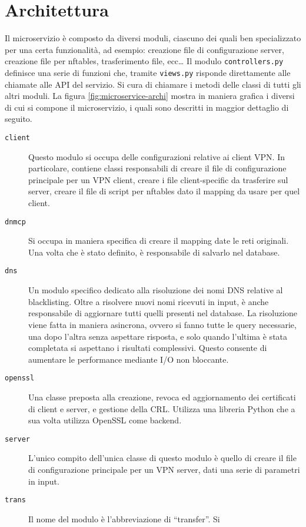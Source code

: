 \section{Architettura}
Il microservizio è composto da diversi moduli, ciascuno dei quali ben
specializzato per una certa funzionalità, ad esempio: creazione file di configurazione
server, creazione file per nftables, trasferimento file, ecc\ldots
Il modulo \texttt{controllers.py}  definisce
una serie di funzioni che, tramite \texttt{views.py} risponde direttamente alle
chiamate alle API del servizio. Si cura di chiamare i metodi delle classi di tutti
gli altri moduli.
La figura \ref{fig:microservice-archi} mostra in maniera grafica i diversi di cui
si compone il microservizio, i quali sono descritti in maggior dettaglio di seguito.

\begin{description}
  \item[\texttt{client}]Questo modulo si occupa delle configurazioni relative ai
  client VPN. In particolare, contiene classi responsabili di creare il file
  di configurazione principale per un VPN client, creare i file client-specific
  da trasferire sul server, creare il file di script per nftables dato il mapping
  da usare per quel client.
  \item[\texttt{dnmcp}]Si occupa in maniera specifica di creare il mapping date
  le reti originali. Una volta che è stato definito, è responsabile di salvarlo
  nel database.
  \item[\texttt{dns}]Un modulo specifico dedicato alla risoluzione dei nomi
  DNS relative al blacklisting. Oltre a risolvere nuovi nomi ricevuti in input,
  è anche responsabile di aggiornare tutti quelli presenti nel database.
  La risoluzione viene fatta in maniera asincrona, ovvero si fanno tutte le query
  necessarie, una dopo l'altra senza aspettare risposta, e solo quando l'ultima
  è stata completata si aspettano i risultati complessivi. Questo consente
  di aumentare le performance mediante I/O non bloccante.
  \item[\texttt{openssl}]Una classe preposta alla creazione, revoca ed aggiornamento
  dei certificati di client e server, e gestione della CRL. Utilizza una
  libreria Python che a sua volta utilizza OpenSSL come backend.
  \item[\texttt{server}]L'unico compito dell'unica classe di questo modulo è quello
  di creare il file di configurazione principale per un VPN server, dati una serie
  di parametri in input.
  \item[\texttt{trans}]Il nome del modulo è l'abbreviazione di ``transfer''. Si

\end{description}
